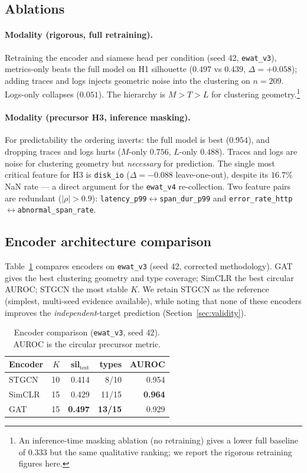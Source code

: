 \subsection{Ablations}
\paragraph{Modality (rigorous, full retraining).}
Retraining the encoder and siamese head per condition (seed 42, \texttt{ewat\_v3}),
metrics-only beats the full model on H1 silhouette ($0.497$ vs $0.439$, $\Delta=+0.058$); adding
traces and logs injects geometric noise into the clustering on $n=209$. Logs-only collapses
($0.051$). The hierarchy is $M>T>L$ for clustering geometry.\footnote{An inference-time masking
ablation (no retraining) gives a lower full baseline of $0.333$ but the same qualitative ranking;
we report the rigorous retraining figures here.}
\paragraph{Modality (precursor H3, inference masking).}
For predictability the ordering inverts: the full model is best ($0.954$), and dropping traces and
logs hurts ($M$-only $0.756$, $L$-only $0.488$). Traces and logs are noise for clustering geometry
but \emph{necessary} for prediction. The single most critical feature for H3 is \texttt{disk\_io}
($\Delta=-0.088$ leave-one-out), despite its $16.7\%$ NaN rate --- a direct argument for the
\texttt{ewat\_v4} re-collection. Two feature pairs are redundant
($|\rho|>0.9$): \texttt{latency\_p99}$\leftrightarrow$\texttt{span\_dur\_p99} and
\texttt{error\_rate\_http}$\leftrightarrow$\texttt{abnormal\_span\_rate}.

\subsection{Encoder architecture comparison}
Table~\ref{tab:arch} compares encoders on \texttt{ewat\_v3} (seed 42, corrected methodology). GAT
gives the best clustering geometry and type coverage; SimCLR the best circular AUROC; STGCN the
most stable $K$. We retain STGCN as the reference (simplest, multi-seed evidence available), while
noting that none of these encoders improves the \emph{independent}-target prediction
(Section~\ref{sec:validity}).

\begin{table}[t]
\centering
\caption{Encoder comparison (\texttt{ewat\_v3}, seed 42). AUROC is the circular precursor metric.}
\label{tab:arch}
\small
\begin{tabularx}{\columnwidth}{@{}Xrrrr@{}}
\toprule
\textbf{Encoder} & $K$ & \textbf{sil$_{\text{test}}$} & \textbf{types} & \textbf{AUROC} \\
\midrule
STGCN  & 10 & 0.414 & 8/10  & 0.954 \\
SimCLR & 15 & 0.429 & 11/15 & \textbf{0.964} \\
GAT    & 15 & \textbf{0.497} & \textbf{13/15} & 0.929 \\
\bottomrule
\end{tabularx}
\end{table}

